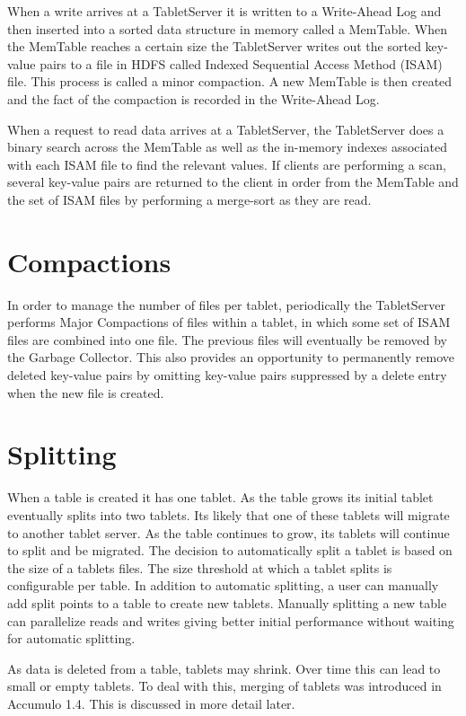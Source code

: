 When a write arrives at a TabletServer it is written to a Write-Ahead Log and
then inserted into a sorted data structure in memory called a MemTable. When the
MemTable reaches a certain size the TabletServer writes out the sorted key-value
pairs to a file in HDFS called Indexed Sequential Access Method (ISAM)
file. This process is called a minor compaction.  A new MemTable is then created
and the fact of the compaction is recorded in the Write-Ahead Log.

When a request to read data arrives at a TabletServer, the TabletServer does a
binary search across the MemTable as well as the in-memory indexes associated
with each ISAM file to find the relevant values. If clients are performing a
scan, several key-value pairs are returned to the client in order from the
MemTable and the set of ISAM files by performing a merge-sort as they are read.

\section{Compactions}

In order to manage the number of files per tablet, periodically the TabletServer
performs Major Compactions of files within a tablet, in which some set of ISAM
files are combined into one file. The previous files will eventually be removed
by the Garbage Collector. This also provides an opportunity to permanently
remove deleted key-value pairs by omitting key-value pairs suppressed by a
delete entry when the new file is created.

\section{Splitting}

When a table is created it has one tablet.  As the table grows its initial
tablet eventually splits into two tablets.   Its likely that one of these
tablets will migrate to another tablet server.  As the table continues to grow,
its tablets will continue to split and be migrated.  The decision to
automatically split a tablet is based on the size of a tablets files.   The
size threshold at which a tablet splits is configurable per table.  In addition
to automatic splitting, a user can manually add split points to a table to
create new tablets.  Manually splitting a new table can parallelize reads and
writes giving better initial performance without waiting for automatic
splitting.

As data is deleted from a table, tablets may shrink.  Over time this can lead
to small or empty tablets.   To deal with this, merging of tablets was
introduced in Accumulo 1.4.  This is discussed in more detail later.

